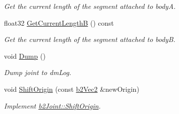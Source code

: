 \begin{DoxyCompactItemize}
\begin{DoxyCompactList}\small\item\em Get the current length of the segment attached to bodyA. \end{DoxyCompactList}\item 
float32 \hyperlink{classb2_pulley_joint_a3b68ad489d726afa74e538331c1f72d8}{Get\+Current\+LengthB} () const \hypertarget{classb2_pulley_joint_a3b68ad489d726afa74e538331c1f72d8}{}\label{classb2_pulley_joint_a3b68ad489d726afa74e538331c1f72d8}

\begin{DoxyCompactList}\small\item\em Get the current length of the segment attached to bodyB. \end{DoxyCompactList}\item 
void \hyperlink{classb2_pulley_joint_ad12d0e03b5d07b2f8af1005c95c67aa2}{Dump} ()\hypertarget{classb2_pulley_joint_ad12d0e03b5d07b2f8af1005c95c67aa2}{}\label{classb2_pulley_joint_ad12d0e03b5d07b2f8af1005c95c67aa2}

\begin{DoxyCompactList}\small\item\em Dump joint to dm\+Log. \end{DoxyCompactList}\item 
void \hyperlink{classb2_pulley_joint_a5b88d498ce306c4ff5ce99dec4811825}{Shift\+Origin} (const \hyperlink{structb2_vec2}{b2\+Vec2} \&new\+Origin)\hypertarget{classb2_pulley_joint_a5b88d498ce306c4ff5ce99dec4811825}{}\label{classb2_pulley_joint_a5b88d498ce306c4ff5ce99dec4811825}

\begin{DoxyCompactList}\small\item\em Implement \hyperlink{classb2_joint_a7804f649e993dc0fd9ae47fde5601f90}{b2\+Joint\+::\+Shift\+Origin}. \end{DoxyCompactList}\end{DoxyCompactItemize}
